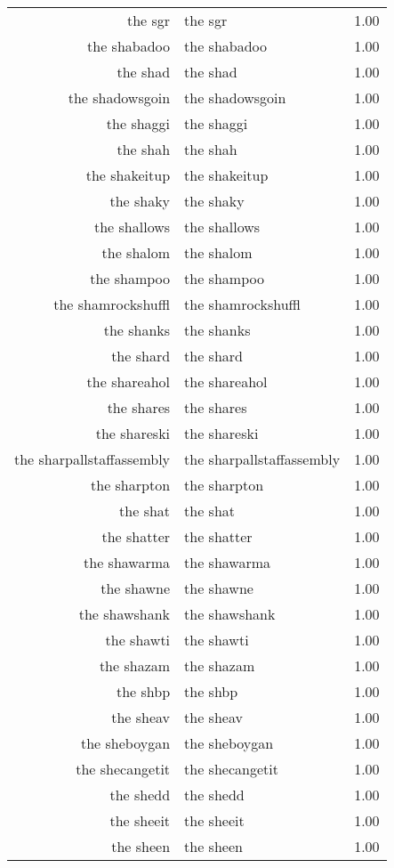 \begin{table}[ht]
\begin{tabular}{rlr}
  the sgr & the sgr & 1.00 \\ 
  the shabadoo & the shabadoo & 1.00 \\ 
  the shad & the shad & 1.00 \\ 
  the shadowsgoin & the shadowsgoin & 1.00 \\ 
  the shaggi & the shaggi & 1.00 \\ 
  the shah & the shah & 1.00 \\ 
  the shakeitup & the shakeitup & 1.00 \\ 
  the shaky & the shaky & 1.00 \\ 
  the shallows & the shallows & 1.00 \\ 
  the shalom & the shalom & 1.00 \\ 
  the shampoo & the shampoo & 1.00 \\ 
  the shamrockshuffl & the shamrockshuffl & 1.00 \\ 
  the shanks & the shanks & 1.00 \\ 
  the shard & the shard & 1.00 \\ 
  the shareahol & the shareahol & 1.00 \\ 
  the shares & the shares & 1.00 \\ 
  the shareski & the shareski & 1.00 \\ 
  the sharpallstaffassembly & the sharpallstaffassembly & 1.00 \\ 
  the sharpton & the sharpton & 1.00 \\ 
  the shat & the shat & 1.00 \\ 
  the shatter & the shatter & 1.00 \\ 
  the shawarma & the shawarma & 1.00 \\ 
  the shawne & the shawne & 1.00 \\ 
  the shawshank & the shawshank & 1.00 \\ 
  the shawti & the shawti & 1.00 \\ 
  the shazam & the shazam & 1.00 \\ 
  the shbp & the shbp & 1.00 \\ 
  the sheav & the sheav & 1.00 \\ 
  the sheboygan & the sheboygan & 1.00 \\ 
  the shecangetit & the shecangetit & 1.00 \\ 
  the shedd & the shedd & 1.00 \\ 
  the sheeit & the sheeit & 1.00 \\ 
  the sheen & the sheen & 1.00 \\ 

\end{tabular}
\end{table}
